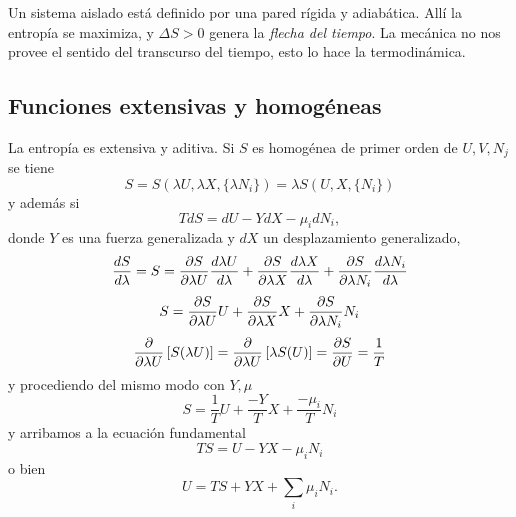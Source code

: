 \documentclass[10pt,oneside]{CBFT_book}
\begin{document}
Un sistema aislado está definido por una pared rígida y adiabática. Allí la entropía se maximiza,
y $\Delta S >0$ genera la {\it flecha del tiempo}.
La mecánica no nos provee el sentido del transcurso del tiempo, esto lo hace la termodinámica.

\subsection{Funciones extensivas y homogéneas}

La entropía es extensiva y aditiva. 
Si $S$ es homogénea de primer orden de $U,V,N_j$ se tiene
\[
	S = S(\lambda U, \lambda X, \{\lambda N_i\}) = \lambda S( U, X, \{ N_i\})
\]
y además si 
\[
	TdS = dU - YdX - \mu_i dN_i,
\]
donde $Y$ es una fuerza generalizada y $dX$ un desplazamiento generalizado,
\[
	\dtot{S}{\lambda} = S = \dpar{S}{\lambda U}\dtot{\lambda U}{\lambda} +
	\dpar{S}{\lambda X}\dtot{\lambda X}{\lambda} +
	\dpar{S}{\lambda N_i}\dtot{\lambda N_i}{\lambda}
\]
\[
	S = \dpar{S}{\lambda U} U + \dpar{S}{\lambda X} X + \dpar{S}{\lambda N_i} N_i
\]
\[
	\dpar{}{\lambda U}\left[ S(\lambda U)\right] = 
	\dpar{}{\lambda U}\left[ \lambda S( U)\right] = \dpar{S}{U} = \frac{1}{T}
\]
y procediendo del mismo modo con $Y,\mu$
\[
	S = \frac{1}{T} U + \frac{-Y}{T} X + \frac{-\mu_i}{T} N_i
\]
y arribamos a la ecuación fundamental
\[
	TS = U - YX - \mu_i N_i 
\]
o bien
\[
	U = TS + YX + \sum_i \mu_i N_i.
\]
\end{document}
